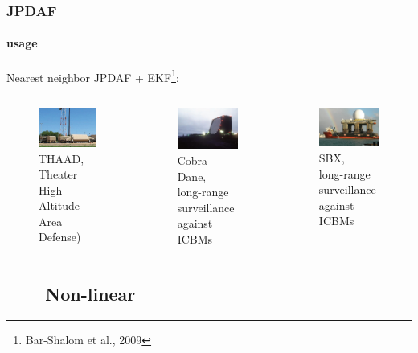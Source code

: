 \begin{frame}
\frametitle{JPDAF}
\framesubtitle{usage}
\logoCSIPCPL\mypagenum
	Nearest neighbor JPDAF + EKF\footnote{Bar-Shalom et al., 2009}:
	\begin{columns}
		\begin{column}{1.0in}
			\begin{figure}
			{
				\includegraphics[width=1.0in]{figs/TRK_JPDAF_example_THAAD.jpg}
				\caption {THAAD, \\Theater High Altitude Area Defense)}
			}
			\end{figure}
		\end{column}
		\begin{column}{1.0in}
			\begin{figure}
			{
				\includegraphics[width=1.0in]{figs/TRK_JPDAF_example_Cobra.jpg}
				\caption {Cobra Dane,\\long-range surveillance against ICBMs}
			}
			\end{figure}
		\end{column}
		\begin{column}{1.0in}
			\begin{figure}
			{
				\includegraphics[width=1.0in]{figs/TRK_JPDAF_example_SBX.jpg}
				\caption {SBX,\\long-range surveillance against ICBMs}
			}
			\end{figure}
		\end{column}
	\end{columns}
\end{frame}

\subsection{\ \ \ \ Non-linear}

